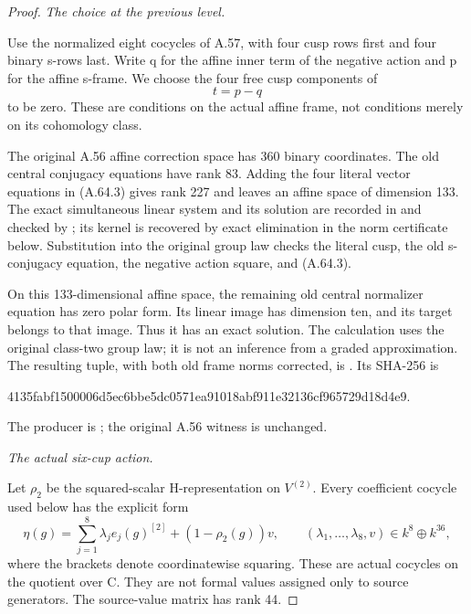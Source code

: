 \begin{proof}
\emph{The choice at the previous level.}\par
Use the normalized eight cocycles of A.57, with four cusp rows first
and four binary s-rows last. Write q for the affine inner term of the
negative action and p for the affine s-frame. We choose the four free
cusp components of
\[
 t=p-q
 \tag{A.64.3}
\]
to be zero. These are conditions on the actual affine frame, not
conditions merely on its cohomology class.

The original A.56 affine correction space has 360 binary coordinates.
The old central conjugacy equations have rank 83. Adding the four
literal vector equations in (A.64.3) gives rank 227 and leaves an
affine space of dimension 133. The exact simultaneous linear system
and its solution are recorded in
 and checked by
; its kernel is recovered by
exact elimination in the norm certificate below. Substitution into the
original group law checks the literal cusp, the old s-conjugacy
equation, the negative action square, and (A.64.3).

On this 133-dimensional affine space, the remaining old central
normalizer equation has zero polar form. Its linear image has
dimension ten, and its target belongs to that image. Thus it has
an exact solution. The calculation uses the original class-two
group law; it is not an inference from a graded approximation.
The resulting tuple, with both old frame norms corrected, is
. Its SHA-256 is
\begin{center}\small\ttfamily
4135fabf1500006d5ec6bbe5dc0571ea91018abf911e32136cf965729d18d4e9.
\end{center}
The producer is ; the
original A.56 witness is unchanged.

\emph{The actual six-cup action.}\par
Let \(\rho_2\) be the squared-scalar H-representation on
\(V^{(2)}\). Every coefficient cocycle used below has the explicit
form
\[
 \eta(g)=\sum_{j=1}^8\lambda_j e_j(g)^{[2]}
              +(1-\rho_2(g))v,
 \qquad (\lambda_1,\ldots,\lambda_8,v)\in k^8\oplus k^{36},
 \tag{A.64.4}
\]
where the brackets denote coordinatewise squaring. These are actual
cocycles on the quotient over C. They are not formal values assigned
only to source generators. The source-value matrix has rank 44.


\end{proof}
